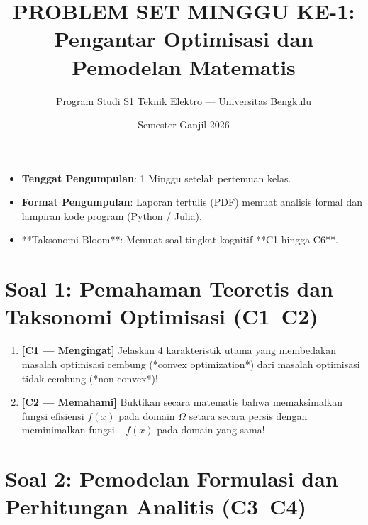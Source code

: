 \documentclass[11pt,a4paper]{article}
\title{\vspace{-1cm}\textbf{PROBLEM SET MINGGU KE-1:}\\Pengantar Optimisasi dan Pemodelan Matematis}
\author{Program Studi S1 Teknik Elektro --- Universitas Bengkulu}
\date{Semester Ganjil 2026}
\begin{document}
\maketitle

\begin{tcolorbox}[colback=unibgold!10,colframe=unibgold!80!black,title=\textbf{Petunjuk Pengerjaan dan Tenggat Waktu}]
\begin{itemize}[leftmargin=*]
    \item \textbf{Tenggat Pengumpulan}: 1 Minggu setelah pertemuan kelas.
    \item \textbf{Format Pengumpulan}: Laporan tertulis (PDF) memuat analisis formal dan lampiran kode program (Python / Julia).
    \item **Taksonomi Bloom**: Memuat soal tingkat kognitif **C1 hingga C6**.
\end{itemize}
\end{tcolorbox}

\vspace{0.3cm}

\section*{Soal 1: Pemahaman Teoretis dan Taksonomi Optimisasi (C1--C2)}

\begin{enumerate}[label=\textbf{1.\arabic*}, leftmargin=*]
    \item \textbf{[C1 --- Mengingat]} Jelaskan 4 karakteristik utama yang membedakan masalah optimisasi cembung (*convex optimization*) dari masalah optimisasi tidak cembung (*non-convex*)!
    
    \item \textbf{[C2 --- Memahami]} Buktikan secara matematis bahwa memaksimalkan fungsi efisiensi $f(x)$ pada domain $\Omega$ setara secara persis dengan meminimalkan fungsi $-f(x)$ pada domain yang sama!
\end{enumerate}

\section*{Soal 2: Pemodelan Formulasi dan Perhitungan Analitis (C3--C4)}
\end{document}
